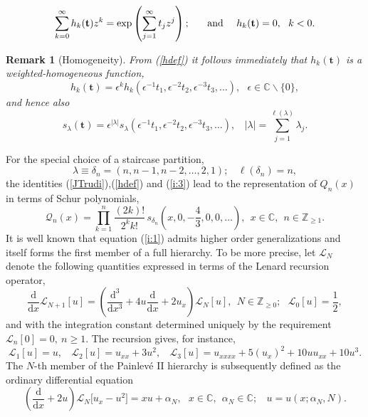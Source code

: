\documentclass[10pt,reqno,oneside]{amsart}
\renewcommand{\d}{{\mathrm d}}
\numberwithin{equation}{section}
\newtheorem{theo}{Theorem}[section]
\newtheorem{remark}[theo]{Remark}
\def\le{\left}
\def\ri{\right}
\def\bt{\begin{theo}}
\def\br{\begin{remark}}
\def\er{\end{remark}}
\def\be{\begin{equation}}
\def\ee{\end{equation}}
\def\C{{\mathbb C}}
\def\L{\mathcal L}
\def\l{\lambda}
\def\eqref#1{(\ref{#1})}
\def\bt{{\mathbf t}}
\begin{document}
\be
\label{hdef}
\sum_{k=0}^{\infty}h_k(\bt)z^{k}=\exp\left(\sum_{j=1}^{\infty}t_j z^j\right); \hspace{0.5cm} \ \textnormal{and}\ \ \ \ h_k(\bt )=0,\ \ k<0.
\ee
\br
[Homogeneity]
From \eqref{hdef} it follows immediately that $h_k(\bt)$ is a weighted-homogeneous function, 
\be\nonumber
h_k(\bt) = 
\epsilon^k h_k \le(\epsilon^{-1} t_1, \epsilon^{-2} t_2, \epsilon^{-3} t_3,\dots \ri),\ \ \ \epsilon \in \C\backslash\{0\},
\ee
and hence also 
\be
\label{homogSchur}
s_\l (\bt) = \epsilon^{|\l|} s_\l \le(\epsilon^{-1} t_1, \epsilon^{-2} t_2, \epsilon^{-3} t_3,\ldots \ri),\ \ \ \ |\lambda|=\sum_{j=1}^{\ell(\lambda)}\lambda_j.
\ee
\er
For the special choice of a staircase partition, 
\begin{equation}\label{stair}
	\lambda\equiv\delta_n=(n,n-1,n-2,\ldots,2,1);\ \ \ \ \ell(\delta_n)=n,
\end{equation}
the identities \eqref{JTrudi},\eqref{hdef} and \eqref{i:3} lead to the representation of $Q_n(x)$ in terms of Schur polynomials,
\begin{equation*}
	\mathcal{Q}_n(x)=\prod_{k=1}^n\frac{(2k)!}{2^kk!}\,s_{\delta_n}\left(x,0,-\frac{4}{3},0,0,\ldots\right),\ \ x\in\mathbb{C},\ \ n\in\mathbb{Z}_{\geq 1}.
\end{equation*}
It is well known that equation \eqref{i:1} admits higher order generalizations and itself forms the first member of a full hierarchy. To be more precise, let $\mathcal{L}_N$ denote the following quantities expressed in terms of the  Lenard recursion operator,
\begin{equation}
\label{Lenardrec}
	\frac{\d}{\d x} \mathcal{L}_{N+1}[u]=\left(\frac{\d^3}{\d x^3}+4u\frac{\d}{\d x}+2u_x\right)\mathcal{L}_N[u],\ \ N\in\mathbb{Z}_{\geq 0};\ \ \ \mathcal{L}_0[u]=\frac{1}{2} ,
\end{equation}
and with the integration constant determined uniquely by the requirement $\L_n[0]=0,\ n\geq 1$.
The recursion gives, for instance, 
\begin{equation*}
	\mathcal{L}_1[u]=u,\ \ \ \ \mathcal{L}_2[u]=u_{xx}+3u^2,\ \ \ \ \mathcal{L}_3[u]=u_{xxxx}+5(u_x)^2+10uu_{xx}+10u^3.
\end{equation*}
The $N$-th member of the Painlev\'e II hierarchy is subsequently defined as the ordinary differential equation
\begin{equation}\label{i:5}
	\left(\frac{\d}{\d x}+2u\right)\mathcal{L}_N\big[u_x-u^2\big]=xu+\alpha_N,\ \ \ x\in\mathbb{C},\ \ \alpha_N\in\mathbb{C};\ \ \ \ u=u(x;\alpha_N,N).
\end{equation}
\end{document}
